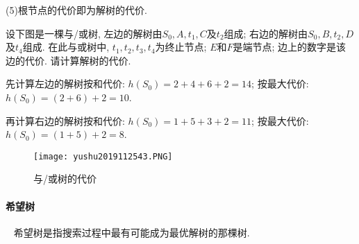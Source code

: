 (5)根节点的代价即为解树的代价.
\begin{example}
  设下图是一棵与/或树, 左边的解树由$S_0,A,t_1,C$及$t_2$组成; 右边的解树由$S_0,B,t_2,D$及$t_4$组成. 在此与或树中, $t_1,t_2,t_3,t_4$为终止节点; $E$和$F$是端节点; 边上的数字是该边的代价. 请计算解树的代价.
\end{example}
\begin{result}
先计算左边的解树按和代价: $h(S_0)=2+4+6+2=14$; 按最大代价: $h(S_0)=(2+6)+2=10$.

再计算右边的解树按和代价: $h(S_0)=1+5+3+2=11$; 按最大代价: $h(S_0)=(1+5)+2=8$.
\begin{figure}[H]
\centering
\texttt{[image: yushu2019112543.PNG]}
\caption{与/或树的代价}
\label{AI32fig43}
\end{figure}
\end{result}
\paragraph{希望树}~{}
希望树是指搜索过程中最有可能成为最优解树的那棵树.

